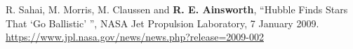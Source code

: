 \begin{cvpubs}
  \cvpub
    {
      \begin{cvetar}
        \item {R. Sahai, M. Morris, M. Claussen and \textbf{R. E. Ainsworth}, ``Hubble Finds Stars That `Go Ballistic' '', NASA Jet Propulsion Laboratory, 7 January 2009. \url{https://www.jpl.nasa.gov/news/news.php?release=2009-002}}
      \end{cvetar}
    }    

\end{cvpubs}

